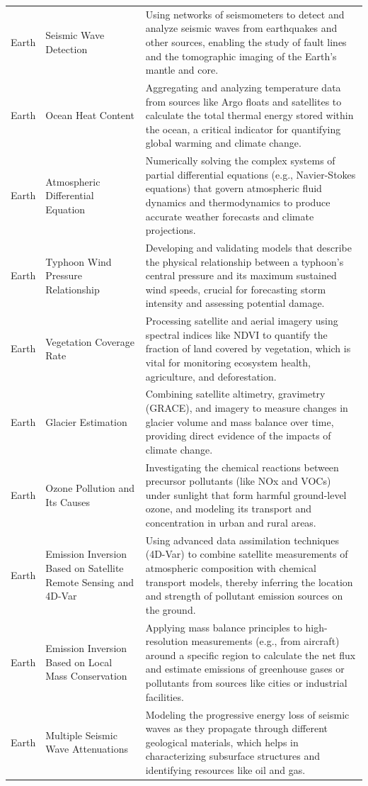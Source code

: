 \begin{longtable}{p{2cm}p{6cm}p{7cm}}
\rowcolor{EarthColor} Earth & Seismic Wave Detection & Using networks of seismometers to detect and analyze seismic waves from earthquakes and other sources, enabling the study of fault lines and the tomographic imaging of the Earth's mantle and core. \\
\rowcolor{EarthColor} Earth & Ocean Heat Content & Aggregating and analyzing temperature data from sources like Argo floats and satellites to calculate the total thermal energy stored within the ocean, a critical indicator for quantifying global warming and climate change. \\
\rowcolor{EarthColor} Earth & Atmospheric Differential Equation & Numerically solving the complex systems of partial differential equations (e.g., Navier-Stokes equations) that govern atmospheric fluid dynamics and thermodynamics to produce accurate weather forecasts and climate projections. \\
\rowcolor{EarthColor} Earth & Typhoon Wind Pressure Relationship & Developing and validating models that describe the physical relationship between a typhoon's central pressure and its maximum sustained wind speeds, crucial for forecasting storm intensity and assessing potential damage. \\
\rowcolor{EarthColor} Earth & Vegetation Coverage Rate & Processing satellite and aerial imagery using spectral indices like NDVI to quantify the fraction of land covered by vegetation, which is vital for monitoring ecosystem health, agriculture, and deforestation. \\
\rowcolor{EarthColor} Earth & Glacier Estimation & Combining satellite altimetry, gravimetry (GRACE), and imagery to measure changes in glacier volume and mass balance over time, providing direct evidence of the impacts of climate change. \\
\rowcolor{EarthColor} Earth & Ozone Pollution and Its Causes & Investigating the chemical reactions between precursor pollutants (like NOx and VOCs) under sunlight that form harmful ground-level ozone, and modeling its transport and concentration in urban and rural areas. \\
\rowcolor{EarthColor} Earth & Emission Inversion Based on Satellite Remote Sensing and 4D-Var & Using advanced data assimilation techniques (4D-Var) to combine satellite measurements of atmospheric composition with chemical transport models, thereby inferring the location and strength of pollutant emission sources on the ground. \\
\rowcolor{EarthColor} Earth & Emission Inversion Based on Local Mass Conservation & Applying mass balance principles to high-resolution measurements (e.g., from aircraft) around a specific region to calculate the net flux and estimate emissions of greenhouse gases or pollutants from sources like cities or industrial facilities. \\
\rowcolor{EarthColor} Earth & Multiple Seismic Wave Attenuations & Modeling the progressive energy loss of seismic waves as they propagate through different geological materials, which helps in characterizing subsurface structures and identifying resources like oil and gas. \\


\end{longtable}
